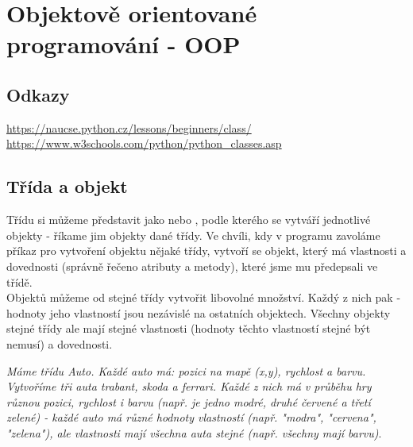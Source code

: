 \section{Objektově orientované programování - OOP}

\subsection{Odkazy}
\url{https://naucse.python.cz/lessons/beginners/class/}\\
\url{https://www.w3schools.com/python/python_classes.asp}\\

\subsection{Třída a objekt}
Třídu si můžeme představit jako  nebo , podle kterého se vytváří jednotlivé objekty - říkame jim objekty dané třídy. Ve chvíli, kdy v programu zavoláme příkaz pro vytvoření objektu nějaké třídy, vytvoří se objekt, který má vlastnosti a dovednosti (správně řečeno atributy a metody), které jsme mu předepsali ve třídě.\\
Objektů můžeme od stejné třídy vytvořit libovolné množství. Každý z nich pak  - hodnoty jeho vlastností jsou nezávislé na ostatních objektech. Všechny objekty stejné třídy ale mají stejné vlastnosti (hodnoty těchto vlastností stejné být nemusí) a dovednosti.\\
\vspace{1cm}

\textit{Máme třídu Auto. Každé auto má: pozici na mapě (x,y), rychlost a barvu. Vytvoříme tři auta trabant, skoda a ferrari. Každé z nich má v průběhu hry různou pozici, rychlost i barvu (např. je jedno modré, druhé červené a třetí zelené) - každé auto má různé hodnoty vlastností (např. "modra", "cervena", "zelena"), ale vlastnosti mají všechna auta stejné (např. všechny mají barvu)}.\\


